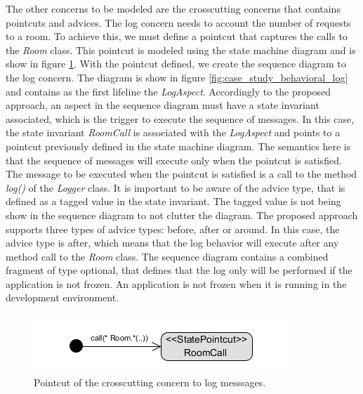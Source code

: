 The other concerns to be modeled are the crosscutting concerns that contains pointcuts and advices. The log concern needs to account the number of
requests to a room. To achieve this, we must define a pointcut that captures the calls to the \textit{Room} class. This pointcut is modeled using the
state machine diagram and is show in figure \ref{fig:case_study_behavioral_pointcut_log}. With the pointcut defined, we create the sequence diagram to
the log concern. The diagram is show in figure \ref{fig:case_study_behavioral_log} and contains as the first lifeline the \textit{LogAspect}.
Accordingly to the proposed approach, an aspect in the sequence diagram must have a state invariant associated, which is the trigger to execute the
sequence of messages. In this case, the state invariant \textit{RoomCall} is associated with the \textit{LogAspect} and points to a pointcut
previously defined in the state machine diagram. The semantics here is that the sequence of messages will execute only when the pointcut is satisfied.
The message to be executed when the pointcut is satisfied is a call to the method \textit{log()} of the \textit{Logger} class. It is important to be
aware of the advice type, that is defined as a tagged value in the state invariant. The tagged value is not being show in the sequence diagram to
not clutter the diagram. The proposed approach supports three types of advice types: before, after or around. In this case, the advice type is after,
which means that the log behavior will execute after any method call to the \textit{Room} class. The sequence diagram contains a combined fragment of 
type optional, that defines that the log only will be performed if the application is not frozen. An application is not frozen when it is running in the development environment.

  \begin{figure}[tb]
	\centering
	\includegraphics[scale=0.6]{img/case_study_behavioral_pointcut_log.png}
	\caption{Pointcut of the crosscutting concern to log messsages.}\label{fig:case_study_behavioral_pointcut_log}
  \end{figure}
  
